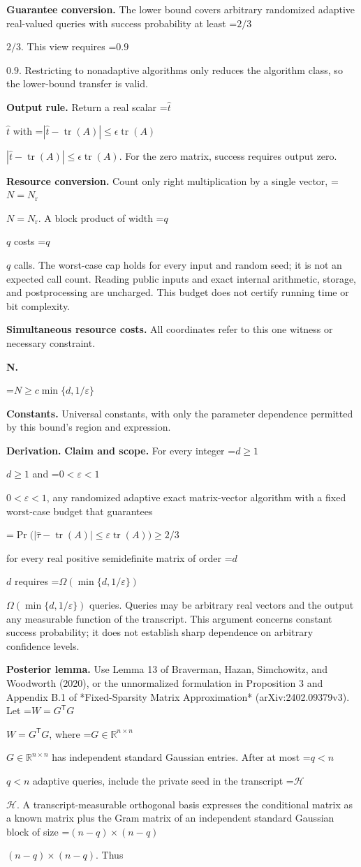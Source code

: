 \documentclass[10pt,a4paper]{article}
\newcommand{\AtlasMath}[1]{\par\begingroup\centering\setbox0=\hbox{$\displaystyle #1$}\ifdim\wd0>1.4\linewidth\typeout{ATLAS WIDE FORMULA: \the\wd0}\fi\ifdim\wd0>\linewidth\resizebox{\linewidth}{!}{\box0}\else\box0\fi\par\endgroup}
\newcommand{\AtlasInlineMath}[1]{\begingroup\setbox0=\hbox{$#1$}\ifdim\wd0>.4\linewidth\endgroup\AtlasMath{#1}\else\endgroup$#1$\fi}
\begin{document}
\textbf{Guarantee conversion.} The lower bound covers arbitrary randomized adaptive real-valued queries with success probability at least \AtlasInlineMath{2/3}. This view requires \AtlasInlineMath{0.9}. Restricting to nonadaptive algorithms only reduces the algorithm class, so the lower-bound transfer is valid.

\textbf{Output rule.} Return a real scalar \AtlasInlineMath{\widehat t} with \AtlasInlineMath{|\widehat t-\operatorname{tr}(A)|\le\epsilon\operatorname{tr}(A)}. For the zero matrix, success requires output zero.

\textbf{Resource conversion.} Count only right multiplication by a single vector, \AtlasInlineMath{N=N_{\mathrm r}}. A block product of width \AtlasInlineMath{q} costs \AtlasInlineMath{q} calls. The worst-case cap holds for every input and random seed; it is not an expected call count. Reading public inputs and exact internal arithmetic, storage, and postprocessing are uncharged. This budget does not certify running time or bit complexity.

\textbf{Simultaneous resource costs.} All coordinates refer to this one witness or necessary constraint.

\textbf{N.}

\AtlasMath{N\ge c\min\{d,1/\varepsilon\}}
\textbf{Constants.} Universal constants, with only the parameter dependence permitted by this bound’s region and expression.

\textbf{Derivation.} \textbf{Claim and scope.} For every integer \AtlasInlineMath{d\ge1} and \AtlasInlineMath{0<\varepsilon<1}, any randomized adaptive exact matrix-vector algorithm with a fixed worst-case budget that guarantees

\AtlasMath{\Pr\bigl(|\widehat\tau-\operatorname{tr}(A)|\le\varepsilon\operatorname{tr}(A)\bigr)\ge2/3}

for every real positive semidefinite matrix of order \AtlasInlineMath{d} requires \AtlasInlineMath{\Omega(\min\{d,1/\varepsilon\})} queries. Queries may be arbitrary real vectors and the output any measurable function of the transcript. This argument concerns constant success probability; it does not establish sharp dependence on arbitrary confidence levels.

\textbf{Posterior lemma.} Use Lemma 13 of Braverman, Hazan, Simchowitz, and Woodworth (2020), or the unnormalized formulation in Proposition 3 and Appendix B.1 of *Fixed-Sparsity Matrix Approximation* (arXiv:2402.09379v3). Let \AtlasInlineMath{W=G^{\mathsf T}G}, where \AtlasInlineMath{G\in\mathbb R^{n\times n}} has independent standard Gaussian entries. After at most \AtlasInlineMath{q<n} adaptive queries, include the private seed in the transcript \AtlasInlineMath{\mathcal H}. A transcript-measurable orthogonal basis expresses the conditional matrix as a known matrix plus the Gram matrix of an independent standard Gaussian block of size \AtlasInlineMath{(n-q)\times(n-q)}. Thus
\end{document}
